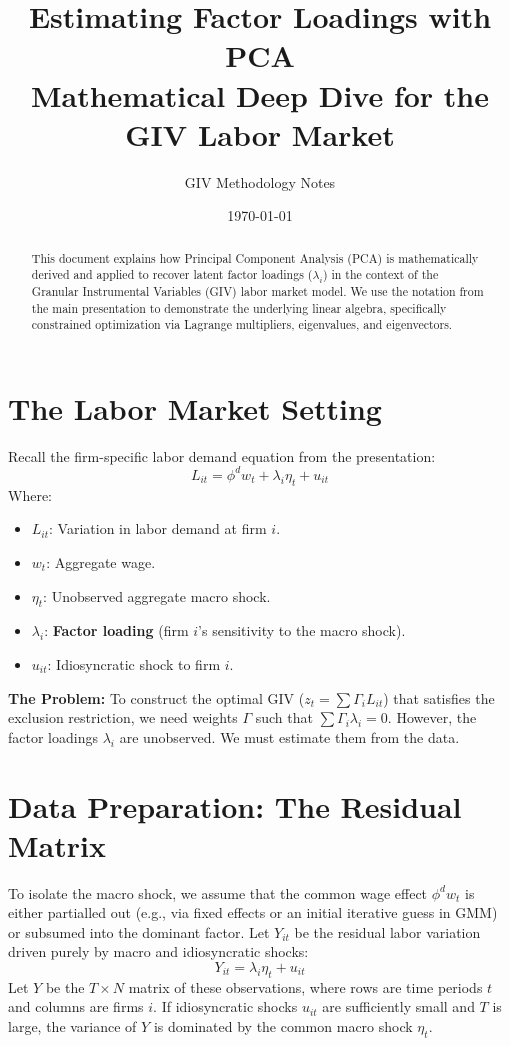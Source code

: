 \documentclass[11pt]{article}
\title{\color{DeepNavy}\huge Estimating Factor Loadings with PCA\\ \large Mathematical Deep Dive for the GIV Labor Market}
\author{GIV Methodology Notes}
\date{\today}
\begin{document}
\maketitle

\begin{abstract}
This document explains how Principal Component Analysis (PCA) is mathematically derived and applied to recover latent factor loadings ($\lambda_i$) in the context of the Granular Instrumental Variables (GIV) labor market model. We use the notation from the main presentation to demonstrate the underlying linear algebra, specifically constrained optimization via Lagrange multipliers, eigenvalues, and eigenvectors.
\end{abstract}

\section{The Labor Market Setting}
Recall the firm-specific labor demand equation from the presentation:
\begin{equation}
    L_{it} = \phi^d w_t + \lambda_i \eta_t + u_{it} \label{eq:demand}
\end{equation}
Where:
\begin{itemize}
    \item $L_{it}$: Variation in labor demand at firm $i$.
    \item $w_t$: Aggregate wage.
    \item $\eta_t$: Unobserved aggregate macro shock.
    \item $\lambda_i$: \textbf{Factor loading} (firm $i$'s sensitivity to the macro shock).
    \item $u_{it}$: Idiosyncratic shock to firm $i$.
\end{itemize}

\textbf{The Problem:} To construct the optimal GIV ($z_t = \sum \Gamma_i L_{it}$) that satisfies the exclusion restriction, we need weights $\Gamma$ such that $\sum \Gamma_i \lambda_i = 0$. However, the factor loadings $\lambda_i$ are unobserved. We must estimate them from the data.

\section{Data Preparation: The Residual Matrix}
To isolate the macro shock, we assume that the common wage effect $\phi^d w_t$ is either partialled out (e.g., via fixed effects or an initial iterative guess in GMM) or subsumed into the dominant factor. Let $Y_{it}$ be the residual labor variation driven purely by macro and idiosyncratic shocks:
\begin{equation}
    Y_{it} = \lambda_i \eta_t + u_{it}
\end{equation}
Let $Y$ be the $T \times N$ matrix of these observations, where rows are time periods $t$ and columns are firms $i$. If idiosyncratic shocks $u_{it}$ are sufficiently small and $T$ is large, the variance of $Y$ is dominated by the common macro shock $\eta_t$.
\end{document}
